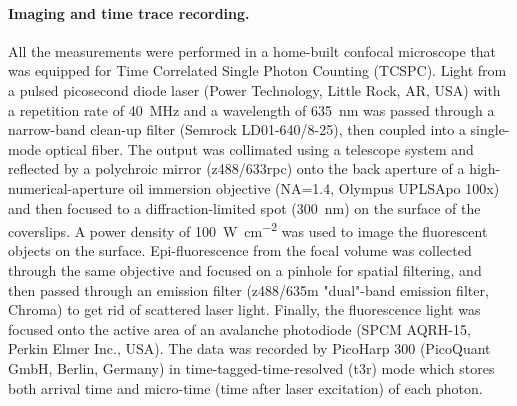 \paragraph*{Imaging and time trace recording.} All the measurements were performed in a home-built confocal microscope that was equipped for Time Correlated Single Photon Counting (TCSPC).
Light from a pulsed picosecond diode laser (Power Technology, Little Rock, AR, USA) with a repetition rate of \SI{40}{\MHz} and a wavelength of \SI{635}{\nm} was passed through a narrow-band clean-up filter (Semrock LD01-640/8-25), then coupled into a single-mode optical fiber.
The output was collimated using a telescope system and reflected by a polychroic mirror (z488/633rpc) onto the back aperture of a high-numerical-aperture oil immersion objective (NA=1.4, Olympus UPLSApo 100x) and then focused to a diffraction-limited spot (\SI{300}{\nm}) on the surface of the coverslips.
A power density of \SI[per-mode=repeated-symbol]{100}{\watt\per\cm\squared} was used to image the fluorescent objects on the surface.
Epi-fluorescence from the focal volume was collected through the same objective and focused on a pinhole for spatial filtering, and then passed through an emission filter (z488/635m "dual"-band emission filter, Chroma) to get rid of scattered laser light.
Finally, the fluorescence light was focused onto the active area of an avalanche photodiode (SPCM AQRH-15, Perkin Elmer Inc., USA).
The data was recorded by PicoHarp 300 (PicoQuant GmbH, Berlin, Germany) in time-tagged-time-resolved (t3r) mode which stores both arrival time and micro-time (time after laser excitation) of each photon.


